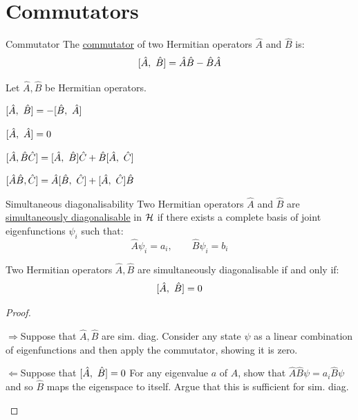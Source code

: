 \documentclass[../Main.tex]{subfiles}
\begin{document}
\section{Commutators}
\begin{definition}{Commutator}
    The \underline{commutator} of two Hermitian operators $\hat{A}$ and $\hat{B}$ is:
    \begin{equation*}
        [\hat{A},~\hat{B}] = \hat{A} \hat{B} - \hat{B} \hat{A}
    \end{equation*}
\end{definition}
\begin{propositions}{
        Let $\hat{A}, \hat{B}$ be Hermitian operators.
        \label{propsCmmtProps}
    }
    \item $[\hat{A},~\hat{B}] = -[\hat{B},~\hat{A}]$ \label{propCmmtAntisym}
    \item $[\hat{A},~\hat{A}] = 0$
    \item $[\hat{A}, \hat{B}\hat{C}] = [\hat{A},~\hat{B}]\hat{C} + \hat{B}[\hat{A},~\hat{C}]$ \label{propCmmtExpand2Arg}
    \item $[\hat{A}\hat{B}, \hat{C}] = \hat{A}[\hat{B},~\hat{C}] + [\hat{A},~\hat{C}]\hat{B}$ \label{propCmmtExpand1Arg}
\end{propositions}
\begin{definition}{Simultaneous diagonalisability}
    Two Hermitian operators $\hat{A}$ and $\hat{B}$ are \underline{simultaneously diagonalisable} in $\mathcal{H}$ if there exists a complete basis of joint eigenfunctions $\psi_i$ such that:
    \begin{equation*}
        \hat{A} \psi_i = a_i,\qquad \hat{B} \psi_i = b_i
    \end{equation*}
\end{definition}
\begin{theorem}
    Two Hermitian operators $\hat{A}, \hat{B}$ are simultaneously diagonalisable if and only if:
    \begin{equation*}
        [\hat{A},~\hat{B}] = 0
    \end{equation*}
    \label{thmSimDiagCmmt}
\end{theorem}
\begin{proof}
    \begin{proofdirection}{$\Rightarrow$}{Suppose that $\hat{A}, \hat{B}$ are sim. diag.}
        Consider any state $\psi$ as a linear combination of eigenfunctions and then apply the commutator, showing it is zero.
    \end{proofdirection}
    \begin{proofdirection}{$\Leftarrow$}{Suppose that $[\hat{A},~\hat{B}] = 0$}
        For any eigenvalue $a$ of $\hat{A}$, show that $\hat{A}\hat{B}\psi = a_i\hat{B}\psi$ and so $\hat{B}$ maps the eigenspace to itself. Argue that this is sufficient for sim. diag.
    \end{proofdirection}
\end{proof}
\end{document}
